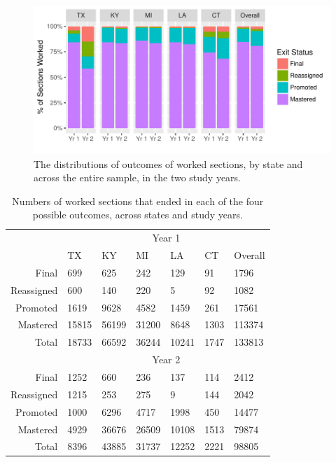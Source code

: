 \documentclass[12pt]{article}\usepackage[]{graphicx}\usepackage[]{color}
\makeatletter
\def\maxwidth{ %
  \ifdim\Gin@nat@width>\linewidth
    \linewidth
  \else
    \Gin@nat@width
  \fi
}
\makeatother
\begin{document}
\begin{figure}
  \centering

\includegraphics[width=\maxwidth]{figure/overallStatus-1} 

\caption{The distributions of outcomes of worked sections, by state and across the
  entire sample, in the two study years.}
\label{fig:overallStatus}
\end{figure}

\begin{table}
  \centering
 \begin{tabular}{rllllll}%

&   \multicolumn{6}{c}{Year 1}\\%
&TX&KY&MI&LA&CT&Overall\\Final&699&625&242&129&91&1796\\Reassigned&600&140&220&5&92&1082\\Promoted&1619&9628&4582&1459&261&17561\\Mastered&15815&56199&31200&8648&1303&113374\\Total&18733&66592&36244&10241&1747&133813\\&\multicolumn{6}{c}{Year 2}\\ 
Final&1252&660&236&137&114&2412\\Reassigned&1215&253&275&9&144&2042\\Promoted&1000&6296&4717&1998&450&14477\\Mastered&4929&36676&26509&10108&1513&79874\\Total&8396&43885&31737&12252&2221&98805\\

\end{tabular}
\caption{Numbers of worked sections that ended in each of the
  four possible outcomes, across states and study years.}
\label{tab:overallStatus}
\end{table}
\end{document}

